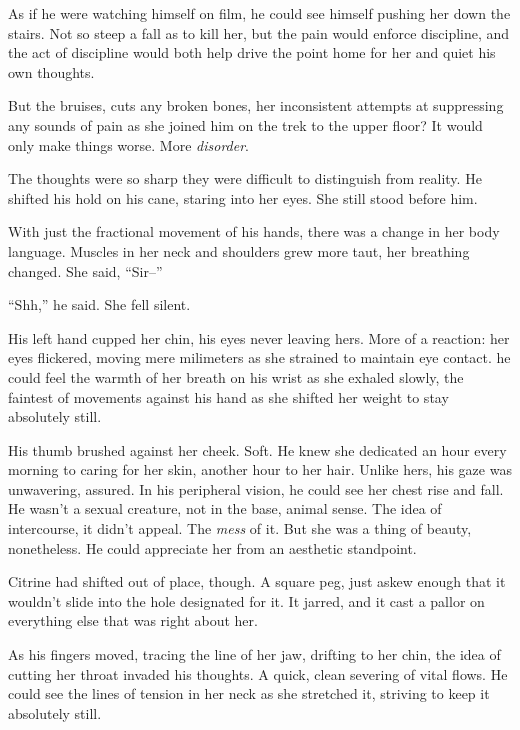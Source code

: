 As if he were watching himself on film, he could see himself pushing her down the stairs.  Not so steep a fall as to kill her, but the pain would enforce discipline, and the act of discipline would both help drive the point home for her and quiet his own thoughts.



But the bruises, cuts any broken bones, her inconsistent attempts at suppressing any sounds of pain as she joined him on the trek to the upper floor?  It would only make things worse.  More \emph{disorder}.



The thoughts were so sharp they were difficult to distinguish from reality.  He shifted his hold on his cane, staring into her eyes.  She still stood before him.



With just the fractional movement of his hands, there was a change in her body language.  Muscles in her neck and shoulders grew more taut, her breathing changed.  She said, ``Sir--''



``Shh,'' he said.  She fell silent.



His left hand cupped her chin, his eyes never leaving hers.  More of a reaction: her eyes flickered, moving mere milimeters as she strained to maintain eye contact.  he could feel the warmth of her breath on his wrist as she exhaled slowly, the faintest of movements against his hand as she shifted her weight to stay absolutely still.



His thumb brushed against her cheek.  Soft.  He knew she dedicated an hour every morning to caring for her skin, another hour to her hair.  Unlike hers, his gaze was unwavering, assured.  In his peripheral vision, he could see her chest rise and fall.  He wasn't a sexual creature, not in the base, animal sense.  The idea of intercourse, it didn't appeal.  The \emph{mess} of it.  But she was a thing of beauty, nonetheless.  He could appreciate her from an aesthetic standpoint.



Citrine had shifted out of place, though.  A square peg, just askew enough that it wouldn't slide into the hole designated for it.  It jarred, and it cast a pallor on everything else that was right about her.



As his fingers moved, tracing the line of her jaw, drifting to her chin, the idea of cutting her throat invaded his thoughts.  A quick, clean severing of vital flows.  He could see the lines of tension in her neck as she stretched it, striving to keep it absolutely still.



